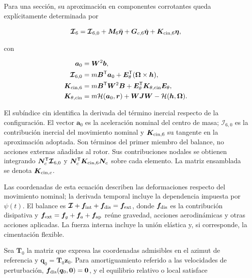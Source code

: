 Para una sección, su aproximación en componentes corrotantes queda explícitamente determinada por

\begin{equation}
\bm{\mathcal I}_6=
\bm{\mathcal I}_{6,0}
+\bm M_6\ddot{\bm\eta}
+\bm G_{c,6}\dot{\bm\eta}
+\bm K_{{\rm cin},6}\bm\eta,
\label{eq:balance-inercial}
\end{equation}

con

\begin{align}
\bm a_0&=\bm W^2\bm b,\nonumber\\
\bm{\mathcal I}_{6,0}
&=m\bm B^\mathsf T\bm a_0+\bm E_\theta^\mathsf T(\bm\Omega\times\bm h),\nonumber\\
\bm K_{{\rm cin},6}
&=m\bm B^\mathsf T\bm W^2\bm B
+\bm E_\theta^\mathsf T\bm K_{\theta,{\rm cin}}\bm E_\theta,\nonumber\\
\bm K_{\theta,{\rm cin}}
&=m\mathcal H(\bm a_0,\bm r)+\bm W\bm J\bm W
-\mathcal H(\bm h,\bm\Omega).
\label{eq:tangente-inercial}
\end{align}

El subíndice $\mathrm{cin}$ identifica la derivada del término inercial respecto de la configuración. El vector $\bm a_0$ es la aceleración nominal del centro de masa; $\bm{\mathcal I}_{6,0}$ es la contribución inercial del movimiento nominal y $\bm K_{{\rm cin},6}$ su tangente en la aproximación adoptada. Son términos del primer miembro del balance, no acciones externas añadidas al rotor. Sus contribuciones nodales se obtienen integrando $\bm N_c^\mathsf T\bm{\mathcal I}_{6,0}$ y $\bm N_c^\mathsf T\bm K_{{\rm cin},6}\bm N_c$ sobre cada elemento. La matriz ensamblada se denota $\bm K_{{\rm cin},c}$.

Las coordenadas de esta ecuación describen las deformaciones respecto del movimiento nominal; la derivada temporal incluye la dependencia impuesta por $\psi(t)$. El balance es
$\bm{\mathcal I}+\bm f_{\rm int}+\bm f_{\rm dis}=\bm f_{\rm ext}$,
donde $\bm f_{\rm dis}$ es la contribución disipativa y $\bm f_{\rm ext}=\bm f_g+\bm f_a+\bm f_{\rm ap}$ reúne gravedad, acciones aerodinámicas y otras acciones aplicadas. La fuerza interna incluye la unión elástica y, si corresponde, la cimentación flexible.

Sea $\bm T_0$ la matriz que expresa las coordenadas admisibles en el azimut de referencia y $\bm q_0=\bm T_0\bm z_0$. Para amortiguamiento referido a las velocidades de perturbación, $\bm f_{\rm dis}(\bm q_0,\bm0)=\bm0$, y el equilibrio relativo o local satisface

